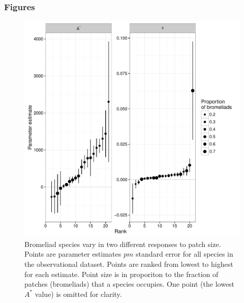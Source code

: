 \subsubsection{Figures}\label{figures}

\begin{figure}[htbp]
\centering
\includegraphics[width=5.5in]{figures/astar_x_rank.pdf}
\caption[Bromeliad species vary in two different responses to patch size]{Bromeliad species vary in two different responses to patch size. Points are parameter estimates \(pm\) standard error for all species in the observational dataset. Points are ranked from lowest to highest for each estimate. Point size is in proporiton to the fraction of patches (bromeliads) that a species occupies. One point (the lowest \(A^{*}\) value) is omitted for clarity.}
\label{fig:astar_x_rank}
\end{figure}

